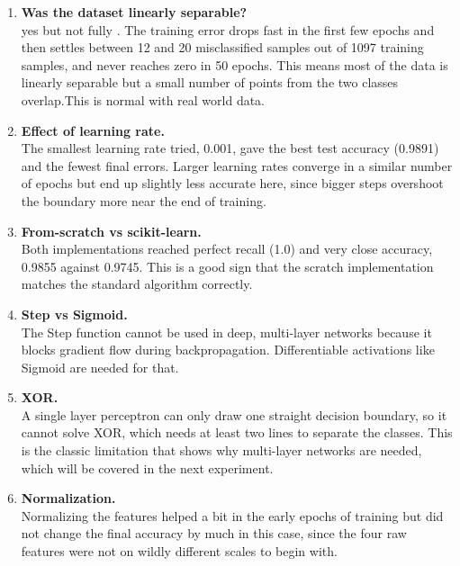 \documentclass[11pt]{article}
\begin{document}
\begin{enumerate}
\item \textbf{Was the dataset linearly separable?}\\
yes but not fully . The training error drops fast in the first few epochs and then settles
between 12 and 20 misclassified samples out of 1097 training samples, and never reaches zero in 50
epochs. This means most of the data is linearly separable but a small number of points from the
two classes overlap.This is normal with real world data.

\item \textbf{Effect of learning rate.}\\
The smallest learning rate tried, 0.001, gave the best test accuracy (0.9891) and the fewest final
errors. Larger learning rates converge in a similar number of epochs but end up slightly less
accurate here, since bigger steps overshoot the boundary more near the end of training.

\item \textbf{From-scratch vs scikit-learn.}\\
Both implementations reached perfect recall (1.0) and very close accuracy, 0.9855 against 0.9745.
This is a good sign that the scratch implementation matches the standard algorithm correctly.

\item \textbf{Step vs Sigmoid.}\\
The Step function cannot be used in deep, multi-layer networks because it blocks gradient flow
during backpropagation. Differentiable activations like Sigmoid are needed for that.

\item \textbf{XOR.}\\
A single layer perceptron can only draw one straight decision boundary, so it cannot solve XOR,
which needs at least two lines to separate the classes. This is the classic limitation that shows
why multi-layer networks are needed, which will be covered in the next experiment.

\item \textbf{Normalization.}\\
Normalizing the features helped a bit in the early epochs of training but did not change the final
accuracy by much in this case, since the four raw features were not on wildly different scales to
begin with.
\end{enumerate}
\end{document}
